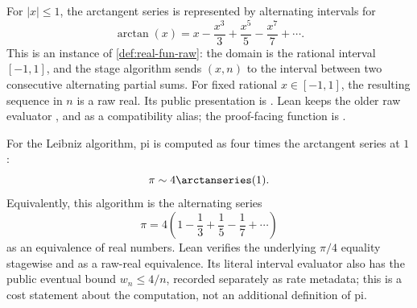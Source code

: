 \begin{definition}\label{def:arctan-series}
For \(|x|\le 1\), the arctangent series is represented by alternating
intervals for
\[
  \arctan(x)=
  x-\frac{x^3}{3}+\frac{x^5}{5}-\frac{x^7}{7}+\cdots .
\]
This is an instance of \cref{def:real-fun-raw}: the domain is the rational
interval \([-1,1]\), and the stage algorithm sends \((x,n)\) to the interval
between two consecutive alternating partial sums.  For fixed rational
\(x\in[-1,1]\), the resulting sequence in \(n\) is a raw real.  Its public
presentation is .  Lean keeps the older raw evaluator
, and  as a
compatibility alias; the proof-facing function is .
\end{definition}

\begin{theorem}\label{thm:leibniz-arctan}
For the Leibniz algorithm, pi is computed as four times the arctangent series
at \(1\):
\[
  \pi \sim 4\arctanseries(1).
\]
Equivalently, this algorithm is the alternating series
\[
  \pi
  =
  4\left(1-\frac13+\frac15-\frac17+\cdots\right)
\]
as an equivalence of real numbers.
Lean verifies the underlying \(\pi/4\) equality stagewise and as a raw-real
equivalence.
Its literal interval evaluator also has the public eventual bound
\(w_n\leq 4/n\), recorded separately as rate metadata; this is a cost
statement about the computation, not an additional definition of pi.
\end{theorem}

